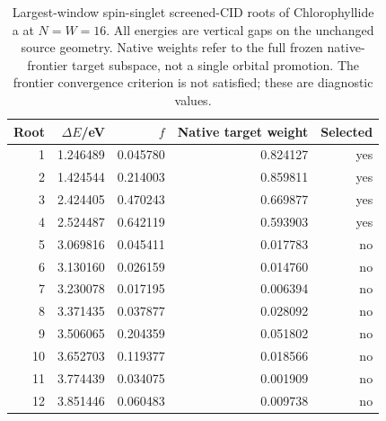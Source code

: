 \begin{table}[!htbp]\centering\small
\caption{Largest-window spin-singlet screened-CID roots of Chlorophyllide a at $N=W=16$. All energies are vertical gaps on the unchanged source geometry. Native weights refer to the full frozen native-frontier target subspace, not a single orbital promotion. The frontier convergence criterion is not satisfied; these are diagnostic values.}
\label{tab:chlorophyllide_transition_cid}
\begin{tabular}{rrrrr}\toprule
Root & $\Delta E$/eV & $f$ & Native target weight & Selected\\\midrule
1 & 1.246489 & 0.045780 & 0.824127 & yes\\
2 & 1.424544 & 0.214003 & 0.859811 & yes\\
3 & 2.424405 & 0.470243 & 0.669877 & yes\\
4 & 2.524487 & 0.642119 & 0.593903 & yes\\
5 & 3.069816 & 0.045411 & 0.017783 & no\\
6 & 3.130160 & 0.026159 & 0.014760 & no\\
7 & 3.230078 & 0.017195 & 0.006394 & no\\
8 & 3.371435 & 0.037877 & 0.028092 & no\\
9 & 3.506065 & 0.204359 & 0.051802 & no\\
10 & 3.652703 & 0.119377 & 0.018566 & no\\
11 & 3.774439 & 0.034075 & 0.001909 & no\\
12 & 3.851446 & 0.060483 & 0.009738 & no\\
\bottomrule\end{tabular}
\end{table}
